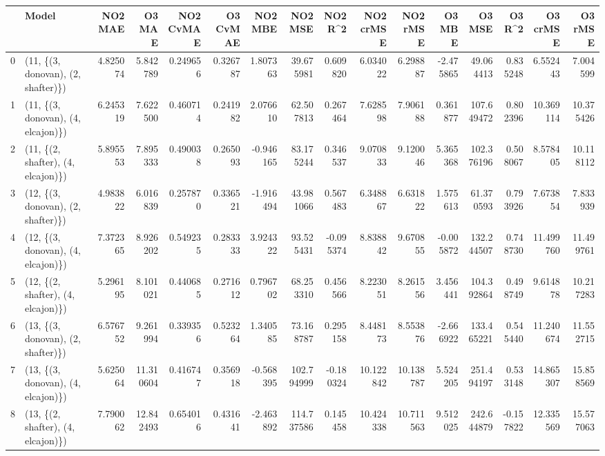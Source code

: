 \begin{tabular}{llrrrrrrrrrrrrrr}
\toprule
{} &                               Model &    NO2 MAE &     O3 MAE &  NO2 CvMAE &  O3 CvMAE &    NO2 MBE &     NO2 MSE &   NO2 R\textasciicircum2 &  NO2 crMSE &   NO2 rMSE &     O3 MBE &      O3 MSE &    O3 R\textasciicircum2 &   O3 crMSE &    O3 rMSE \\
\midrule
0  &  (11, \{(3, donovan), (2, shafter)\}) &   4.825074 &   5.842789 &   0.249656 &  0.326787 &   1.807363 &   39.675981 &  0.609820 &   6.034022 &   6.298887 &  -2.475865 &   49.064413 &  0.835248 &   6.552443 &   7.004599 \\
1  &  (11, \{(3, donovan), (4, elcajon)\}) &   6.245319 &   7.622500 &   0.460714 &  0.241982 &   2.076610 &   62.507813 &  0.267464 &   7.628598 &   7.906188 &   0.361877 &  107.649472 &  0.802396 &  10.369114 &  10.375426 \\
2  &  (11, \{(2, shafter), (4, elcajon)\}) &   5.895553 &   7.895333 &   0.490038 &  0.265093 &  -0.946165 &   83.175244 &  0.346537 &   9.070833 &   9.120046 &   5.365368 &  102.376196 &  0.508067 &   8.578405 &  10.118112 \\
3  &  (12, \{(3, donovan), (2, shafter)\}) &   4.983822 &   6.016839 &   0.257870 &  0.336521 &  -1.916494 &   43.981066 &  0.567483 &   6.348867 &   6.631822 &   1.575613 &   61.370593 &  0.793926 &   7.673854 &   7.833939 \\
4  &  (12, \{(3, donovan), (4, elcajon)\}) &   7.372365 &   8.926202 &   0.549235 &  0.283333 &   3.924322 &   93.525431 & -0.095374 &   8.838842 &   9.670855 &  -0.005872 &  132.244507 &  0.748730 &  11.499760 &  11.499761 \\
5  &  (12, \{(2, shafter), (4, elcajon)\}) &   5.296195 &   8.101021 &   0.440685 &  0.271612 &   0.796702 &   68.253310 &  0.456566 &   8.223051 &   8.261556 &   3.456441 &  104.392864 &  0.498749 &   9.614878 &  10.217283 \\
6  &  (13, \{(3, donovan), (2, shafter)\}) &   6.576752 &   9.261994 &   0.339356 &  0.523264 &   1.340585 &   73.168787 &  0.295158 &   8.448173 &   8.553876 &  -2.666922 &  133.465221 &  0.545440 &  11.240674 &  11.552715 \\
7  &  (13, \{(3, donovan), (4, elcajon)\}) &   5.625064 &  11.310604 &   0.416747 &  0.356918 &  -0.568395 &  102.794999 & -0.180324 &  10.122842 &  10.138787 &   5.524205 &  251.494197 &  0.533148 &  14.865307 &  15.858569 \\
8  &  (13, \{(2, shafter), (4, elcajon)\}) &   7.790062 &  12.842493 &   0.654016 &  0.431641 &  -2.463892 &  114.737586 &  0.145458 &  10.424338 &  10.711563 &   9.512025 &  242.644879 & -0.157822 &  12.335569 &  15.577063 \\

\end{tabular}
